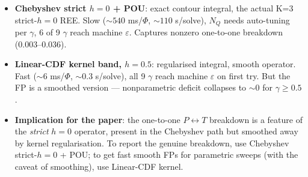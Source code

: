 \documentclass[11pt]{article}
\begin{document}
\begin{itemize}
  \item \textbf{Chebyshev strict $h{=}0$ + POU}: exact contour integral,
        the actual K=3 strict-$h{=}0$ REE. Slow ($\sim 540$ ms/$\Phi$,
        $\sim 110$ s/solve), $N_Q$ needs auto-tuning per $\gamma$, 6 of 9
        $\gamma$ reach machine $\varepsilon$. Captures nonzero one-to-one
        breakdown (0.003--0.036).
  \item \textbf{Linear-CDF kernel band, $h=0.5$}: regularised integral,
        smooth operator. Fast ($\sim 6$ ms/$\Phi$, $\sim 0.3$ s/solve), all
        9 $\gamma$ reach machine $\varepsilon$ on first try. But the FP
        is a smoothed version --- nonparametric deficit collapses to $\sim 0$
        for $\gamma\!\geq\!0.5$.
  \item \textbf{Implication for the paper}: the one-to-one $P \leftrightarrow T$
        breakdown is a feature of the \emph{strict} $h{=}0$ operator,
        present in the Chebyshev path but smoothed away by kernel
        regularisation. To report the genuine breakdown, use Chebyshev
        strict-$h{=}0$ + POU; to get fast smooth FPs for parametric
        sweeps (with the caveat of smoothing), use Linear-CDF kernel.
\end{itemize}
\end{document}
